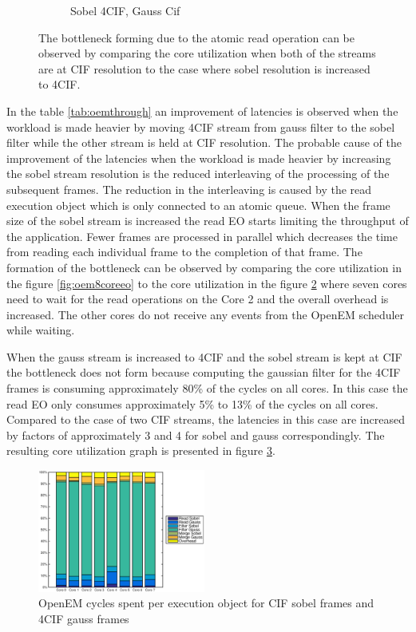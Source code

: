 \begin{figure}
\begin{subfigure}[t]{0.49\textwidth}
        \caption{Sobel 4CIF, Gauss Cif}
        \label{fig:oem8coreeosobel4cif}
    \end{subfigure}
    \caption{The bottleneck forming due to the atomic read operation can be
    observed by comparing the core utilization when both of the streams are at
    CIF resolution to the case where sobel resolution is increased to 4CIF.}
\end{figure}

In the table \ref{tab:oemthrough} an improvement of latencies is observed when
the workload is made heavier by moving 4CIF stream from gauss filter to the
sobel filter while the other stream is held at CIF resolution. The probable
cause of the improvement of the latencies when the workload is made heavier by
increasing the sobel stream resolution is the reduced interleaving of the
processing of the subsequent frames. The reduction in the interleaving is caused
by the read execution object which is only connected to an atomic queue. When
the frame size of the sobel stream is increased the read EO starts limiting the
throughput of the application. Fewer frames are processed in parallel which
decreases the time from reading each individual frame to the completion of that
frame. The formation of the bottleneck can be observed by comparing the core
utilization in the figure \ref{fig:oem8coreeo} to the core utilization in the
figure \ref{fig:oem8coreeosobel4cif} where seven cores need to wait for the read
operations on the Core 2 and the overall overhead is increased. The other cores
do not receive any events from the OpenEM scheduler while waiting.

When the gauss stream is increased to 4CIF and the sobel stream is kept at CIF
the bottleneck does not form because computing the gaussian filter for the 4CIF
frames is consuming approximately 80\% of the cycles on all cores. In this case
the read EO only consumes approximately 5\% to 13\% of the cycles on all cores.
Compared to the case of two CIF streams, the latencies in this case are
increased by factors of approximately 3 and 4 for sobel and gauss
correspondingly. The resulting core utilization graph is presented in figure
\ref{fig:oem8coreeogauss4cif}.

\begin{figure}[h]
    \begin{center}
        \includegraphics[width=0.49\textwidth]{images/openem_sobelcif_gauss4cif_eo.eps}
        \caption{OpenEM cycles spent per execution object for CIF sobel frames
        and 4CIF gauss frames}
        \label{fig:oem8coreeogauss4cif}
    \end{center}
\end{figure}

